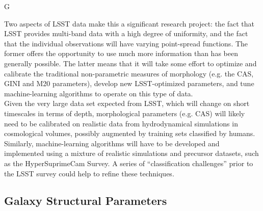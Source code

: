 {\begin{tasklist}{G}
\begin{task}
{Two aspects of LSST data make this a significant research project: the fact that LSST provides multi-band data with a high degree of uniformity, and the fact that the individual observations will have varying point-spread functions. The former offers the opportunity to use much more information than has been generally possible. The latter means that it will take some effort to optimize and calibrate the traditional non-parametric measures of morphology (e.g. the CAS, GINI and M20 parameters), develop new LSST-optimized parameters, and tune machine-learning algorithms to operate on this type of data. 
\\
Given the very large data set expected from LSST, which will change on short timescales in terms of depth, morphological parameters (e.g. CAS) will likely need to be calibrated on realistic data from hydrodynamical simulations in cosmological volumes, possibly augmented by training sets classified by humans. Similarly, machine-learning algorithms will have to be developed and implemented using a mixture of realistic simulations and precursor datasets, such as the HyperSuprimeCam Survey. A series of ``classification challenges'' prior to the LSST survey could help to refine these techniques. 
}
~\\
\end{task}


\subsection{Galaxy Structural Parameters}


\end{tasklist}}
